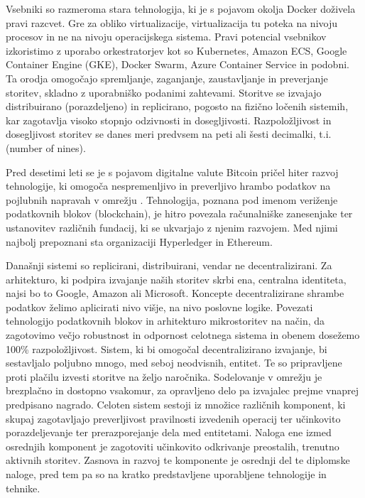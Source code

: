 \documentclass[a4paper, 12pt]{book}
\begin{document}
Vsebniki so razmeroma stara tehnologija, ki je s pojavom okolja Docker doživela pravi razcvet.
Gre za  obliko virtualizacije, virtualizacija tu poteka na nivoju procesov in ne na nivoju operacijskega sistema.
Pravi potencial vsebnikov izkoristimo z uporabo orkestratorjev kot so Kubernetes, Amazon ECS, Google Container Engine (GKE), Docker Swarm, Azure Container Service in podobni.
Ta orodja omogočajo spremljanje, zaganjanje, zaustavljanje in preverjanje storitev, skladno z uporabniško podanimi zahtevami.
Storitve se izvajajo distribuirano (porazdeljeno) in replicirano, pogosto na fizično ločenih sistemih, kar zagotavlja visoko stopnjo odzivnosti in dosegljivosti. Razpoložljivost in dosegljivost storitev se danes meri predvsem na peti ali šesti decimalki, t.i.  (number of nines).

Pred desetimi leti se je s pojavom digitalne valute Bitcoin pričel hiter razvoj tehnologije, ki omogoča nespremenljivo in preverljivo hrambo podatkov na pojlubnih napravah v omrežju \cite{nakamoto2008bitcoin}.
Tehnologija, poznana pod imenom veriženje podatkovnih blokov (blockchain), je hitro povezala računalniške zanesenjake ter ustanovitev različnih fundacij, ki se ukvarjajo z njenim razvojem.
Med njimi najbolj prepoznani sta organizaciji Hyperledger in Ethereum.

Današnji sistemi so replicirani, distribuirani, vendar ne decentralizirani.
Za arhitekturo, ki podpira izvajanje naših storitev skrbi ena, centralna identiteta, najsi bo to Google, Amazon ali Microsoft.
Koncepte decentralizirane shrambe podatkov želimo aplicirati nivo višje, na nivo poslovne logike.
Povezati tehnologijo podatkovnih blokov in arhitekturo mikrostoritev na način, da zagotovimo večjo robustnost in odpornost celotnega sistema in obenem dosežemo 100\% razpoložljivost.
Sistem, ki bi omogočal decentralizirano izvajanje, bi sestavljalo poljubno mnogo, med seboj neodvisnih, entitet.
Te so pripravljene proti plačilu izvesti storitve na željo naročnika.
Sodelovanje v omrežju je brezplačno in dostopno vsakomur, za opravljeno delo pa izvajalec prejme vnaprej predpisano nagrado.
Celoten sistem sestoji iz množice različnih komponent, ki skupaj zagotavljajo preverljivost pravilnosti izvedenih operacij ter učinkovito porazdeljevanje ter prerazporejanje dela med entitetami.
Naloga ene izmed osrednjih komponent je zagotoviti učinkovito odkrivanje preostalih, trenutno aktivnih storitev.
Zasnova in razvoj te komponente je osrednji del te diplomske naloge, pred tem pa so na kratko predstavljene uporabljene tehnologije in tehnike.
\end{document}
